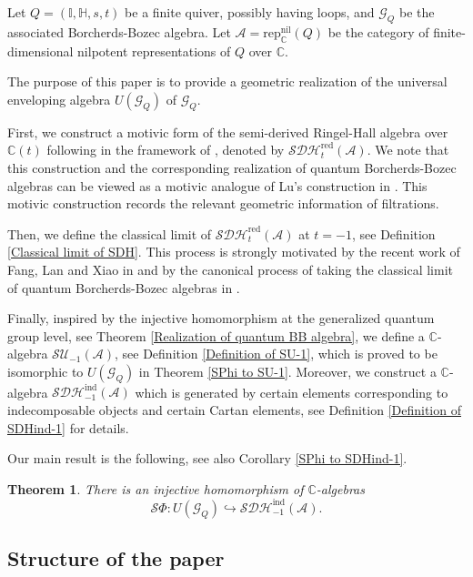 \documentclass[12pt]{amsart}
\newtheorem{theorem}{Theorem}[section]
\theoremstyle{definition}
\numberwithin{equation}{section}
\begin{document}
Let $ Q=(\mathbb{I},\mathbb{H},s,t) $ be a finite quiver, possibly having loops, and $ \mathcal{G}_Q $ be the associated Borcherds-Bozec algebra. 
Let $ \mathcal{A}= \mathrm{rep}^{\mathrm{nil}}_{\mathbb{C}}(Q) $ be the category of finite-dimensional nilpotent representations of $ Q $ over $ \mathbb{C} $. 

The purpose of this paper is to provide a geometric realization of the universal enveloping algebra $ U(\mathcal{G}_Q) $ of $ \mathcal{G}_Q $. 

First, we construct a motivic form of the semi-derived Ringel-Hall algebra over $ \mathbb{C}(t) $ following \cite{LP21} in the framework of \cite{Joyce07}, denoted by $ \mathcal{SDH}_t^{\mathrm{red}}(\mathcal{A}) $. 
We note that this construction and the corresponding realization of quantum Borcherds-Bozec algebras can be viewed as a motivic analogue of Lu's construction in \cite{L23}. 
This motivic construction records the relevant geometric information of filtrations. 

Then, we define the classical limit of $ \mathcal{SDH}_t^{\mathrm{red}}(\mathcal{A}) $ at $ t=-1 $, see Definition \ref{Classical limit of SDH}. 
This process is strongly motivated by the recent work of Fang, Lan and Xiao in \cite{FLX24} and by the canonical process of taking the classical limit of quantum Borcherds-Bozec algebras in \cite{FKKB21}. 

Finally, inspired by the injective homomorphism at the generalized quantum group level, see Theorem \ref{Realization of quantum BB algebra}, we define a $ \mathbb{C} $-algebra $ \mathcal{SU}_{-1}(\mathcal{A}) $, see Definition \ref{Definition of SU-1}, which is proved to be isomorphic to $ U(\mathcal{G}_Q) $ in Theorem \ref{SPhi to SU-1}. 
Moreover, we construct a $ \mathbb{C} $-algebra $ \mathcal{SDH}_{-1}^{\mathrm{ind}}(\mathcal{A}) $ which is generated by certain elements corresponding to indecomposable objects and certain Cartan elements, see Definition \ref{Definition of SDHind-1} for details. 

Our main result is the following, see also Corollary \ref{SPhi to SDHind-1}. 


\begin{theorem}
    \label{First main result}
    There is an injective homomorphism of $ \mathbb{C} $-algebras
    \[ \mathcal{S}\Phi: U(\mathcal{G}_Q) \hookrightarrow \mathcal{SDH}^{\mathrm{ind}}_{-1}(\mathcal{A}). \] 
\end{theorem}

\subsection{Structure of the paper}\;
\end{document}
